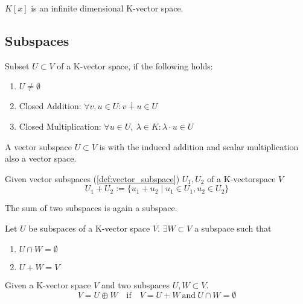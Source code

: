 \begin{example}
   \(K[x]\) is an infinite dimensional K-vector space.
\end{example}

\subsection{Subspaces}
\begin{definition}\label{def:vector_subspace}
   Subset \(U \subset V\) of a K-vector space, if the following holds:

   \begin{enumerate}[label=\roman*, align=Center]
      \item \(U \neq \emptyset\)
      \item Closed Addition: \(\forall v, u \in U: v \dotplus u \in U\)
      \item Closed Multiplication: \(\forall u \in U,~\lambda \in K: \lambda \cdot u \in U\)
   \end{enumerate}
\end{definition}

\begin{theorem}[Subspace = Vector Space]\label{thm:subspace=vecspace}
   A vector subspace \(U \subset V\) is with the induced addition and scalar multiplication also a vector space.
\end{theorem}

\begin{definition}\label{def:subspace_sum}
   Given vector subspaces (\ref{def:vector_subspace}) \(U_1, U_2\) of a K-vectorspace \(V\)
   \[U_1 + U_2 := \{u_1 + u_2 \mid u_1 \in U_1, u_2 \in U_2\}\]
\end{definition}
\begin{remark}
   The sum of two subspaces is again a subspace.
\end{remark}

\begin{lemma}\label{lem:vectorspace_complement}
   Let \(U\) be subspaces of a K-vector space \(V\).
   \(\exists W \subset V\) a subspace such that
   \begin{enumerate}[label=\roman*, align=Center]
      \item \(U \cap W = \emptyset\)
      \item \(U + W = V\)
   \end{enumerate}
\end{lemma}

\begin{definition}\label{def:direct_sum}
   Given a K-vector space \(V\) and two subspaces \(U, W \subset V\).
   \[V = U \oplus W \quad\text{if}\quad V = U + W~\text{and}~U \cap W = \emptyset\]
\end{definition}

